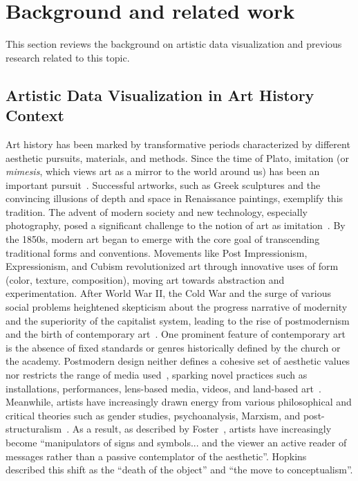 \section{Background and related work}


This section reviews the background on artistic data visualization and previous research related to this topic.

\subsection{Artistic Data Visualization in Art History Context}
\label{ssec:contemporary}

Art history has been marked by transformative periods characterized by different aesthetic pursuits, materials, and methods. Since the time of Plato, imitation (or \textit{mimesis}, which views art as a mirror to the world around us) has been an important pursuit~\cite{pooke2021art}. Successful artworks, such as Greek sculptures and the convincing illusions of depth and space in Renaissance paintings, exemplify this tradition.
The advent of modern society and new technology, especially photography, posed a significant challenge to the notion of art as imitation~\cite{perry2004themes}. By the 1850s, modern art began to emerge with the core goal of transcending traditional forms and conventions. Movements like Post Impressionism, Expressionism, and Cubism revolutionized art through innovative uses of form (\eg color, texture, composition), moving art towards abstraction and experimentation. 
After World War II, the Cold War and the surge of various social problems heightened skepticism about the progress narrative of modernity and the superiority of the capitalist system, leading to the rise of postmodernism and the birth of contemporary art~\cite{hopkins2000after,harrison1992art}. One prominent feature of contemporary art is the absence of fixed standards or genres historically defined by the church or the academy. Postmodern design neither defines a cohesive set of aesthetic values nor restricts the range of media used~\cite{pooke2021art}, sparking novel practices such as installations, performances, lens-based media, videos, and land-based art~\cite{hopkins2000after}.
Meanwhile, artists have increasingly drawn energy from various philosophical and critical theories such as gender studies, psychoanalysis, Marxism, and post-structuralism~\cite{pooke2021art}. As a result, as described by Foster~\cite{foster1999recodings}, artists have increasingly become ``manipulators of signs and symbols... and the viewer an active reader of messages rather than a passive contemplator of the aesthetic''. Hopkins~\cite{hopkins2000after} described this shift as the ``death of the object'' and ``the move to conceptualism''. 

